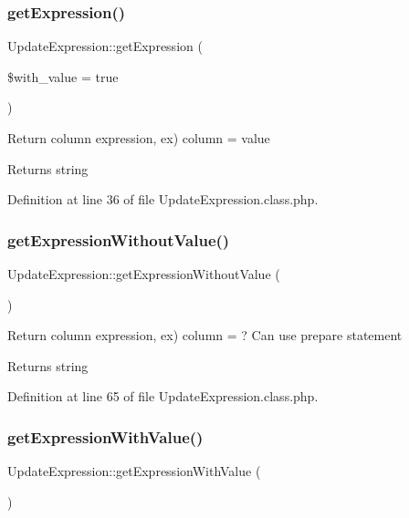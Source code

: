 \subsubsection{\texorpdfstring{get\+Expression()}{getExpression()}}
{\footnotesize\ttfamily Update\+Expression\+::get\+Expression (\begin{DoxyParamCaption}\item[{}]{\$with\+\_\+value = {\ttfamily true} }\end{DoxyParamCaption})}

Return column expression, ex) column = value \begin{DoxyReturn}{Returns}
string 
\end{DoxyReturn}


Definition at line 36 of file Update\+Expression.\+class.\+php.

\mbox{\label{classUpdateExpression_a91fc65199f195dd3c5ef96a6328b7554}} 
\subsubsection{\texorpdfstring{get\+Expression\+Without\+Value()}{getExpressionWithoutValue()}}
{\footnotesize\ttfamily Update\+Expression\+::get\+Expression\+Without\+Value (\begin{DoxyParamCaption}{ }\end{DoxyParamCaption})}

Return column expression, ex) column = ? Can use prepare statement \begin{DoxyReturn}{Returns}
string 
\end{DoxyReturn}


Definition at line 65 of file Update\+Expression.\+class.\+php.

\mbox{\label{classUpdateExpression_abf5aa8ed9c023906f684c31ef735ecd6}} 
\subsubsection{\texorpdfstring{get\+Expression\+With\+Value()}{getExpressionWithValue()}}
{\footnotesize\ttfamily Update\+Expression\+::get\+Expression\+With\+Value (\begin{DoxyParamCaption}{ }\end{DoxyParamCaption})}

